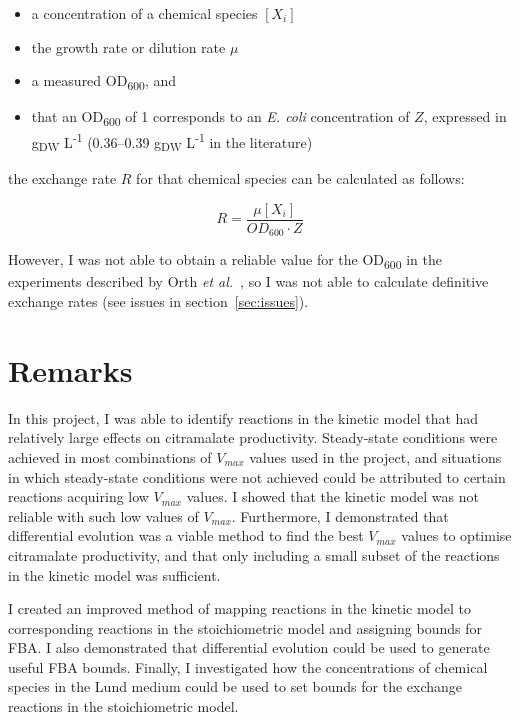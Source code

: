 \documentclass[parskip=full, numbers=noenddot]{scrreprt}
\begin{document}
\begin{itemize}
\item a concentration of a chemical species $[X_{i}]$
\item the growth rate or dilution rate $\mu$
\item a measured OD\textsubscript{600}, and
\item that an OD\textsubscript{600} of 1 corresponds to an \emph{E. coli} concentration of $Z$, expressed in g\textsubscript{DW} L\textsuperscript{-1} (0.36--0.39 g\textsubscript{DW} L\textsuperscript{-1} in the literature)
\end{itemize}
  
the exchange rate $R$ for that chemical species can be calculated as follows:

\[
  R = \frac{\mu[X_{i}]}{OD_{600} \cdot Z}
\]

However, I was not able to obtain a reliable value for the OD\textsubscript{600} in the experiments described by Orth \emph{et al.}~\cite{orth_comprehensive_2011}, so I was not able to calculate definitive exchange rates (see issues in section~\ref{sec:issues}).

\chapter{Remarks}
\label{ch:remarks}

In this project, I was able to identify reactions in the kinetic model that had relatively large effects on citramalate productivity. Steady-state conditions were achieved in most combinations of $V_{max}$ values used in the project, and situations in which steady-state conditions were not achieved could be attributed to certain reactions acquiring low $V_{max}$ values. I showed that the kinetic model was not reliable with such low values of $V_{max}$. Furthermore, I demonstrated that differential evolution was a viable method to find the best $V_{max}$ values to optimise citramalate productivity, and that only including a small subset of the reactions in the kinetic model was sufficient.

I created an improved method of mapping reactions in the kinetic model to corresponding reactions in the stoichiometric model and assigning bounds for FBA. I also demonstrated that differential evolution could be used to generate useful FBA bounds. Finally, I investigated how the concentrations of chemical species in the Lund medium could be used to set bounds for the exchange reactions in the stoichiometric model.
\end{document}
